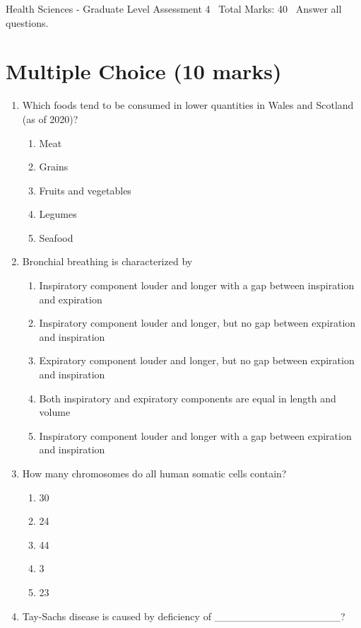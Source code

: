 \documentclass[12pt]{article}
\begin{document}
\begin{center}
Health Sciences - Graduate Level Assessment 4 \
Total Marks: 40 \
Answer all questions.
\end{center}

\section*{Multiple Choice (10 marks)}
\begin{enumerate}[label=\arabic*.]
\item Which foods tend to be consumed in lower quantities in Wales and Scotland (as of 2020)?
\begin{enumerate}[label=(\alph*)]
    \item Meat
    \item Grains
    \item Fruits and vegetables
    \item Legumes
    \item Seafood
\end{enumerate}
\item Bronchial breathing is characterized by
\begin{enumerate}[label=(\alph*)]
    \item Inspiratory component louder and longer with a gap between inspiration and expiration
    \item Inspiratory component louder and longer, but no gap between expiration and inspiration
    \item Expiratory component louder and longer, but no gap between expiration and inspiration
    \item Both inspiratory and expiratory components are equal in length and volume
    \item Inspiratory component louder and longer with a gap between expiration and inspiration
\end{enumerate}
\item How many chromosomes do all human somatic cells contain?
\begin{enumerate}[label=(\alph*)]
    \item 30
    \item 24
    \item 44
    \item 3
    \item 23
\end{enumerate}
\item Tay-Sachs disease is caused by deficiency of \_\_\_\_\_\_\_\_\_\_\_\_\_\_\_\_\_?
\begin{enumerate}[label=(\alph*)]

\end{enumerate}
\end{enumerate}
\end{document}

